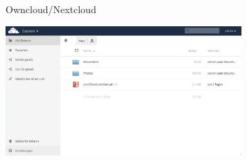 \begin{frame}{Owncloud/Nextcloud}
  \begin{center}
    \includegraphics[width=9cm]{../../img/owncloud-screenshot.jpg}
  \end{center}
\end{frame}
